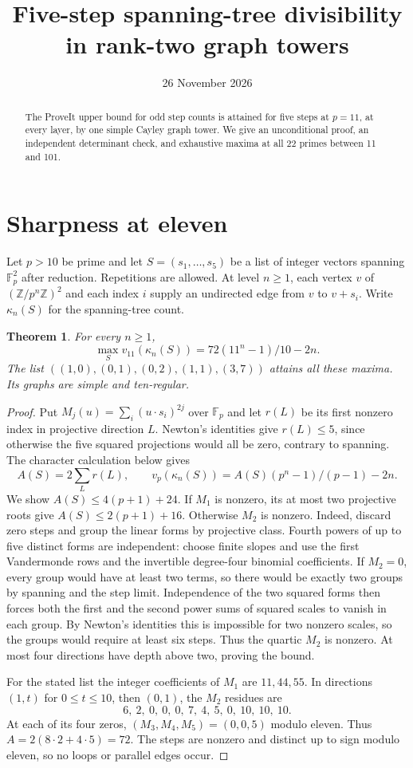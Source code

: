 \documentclass[11pt]{article}
\title{Five-step spanning-tree divisibility\\in rank-two graph towers}
\author{}
\date{26 November 2026}
\newtheorem{theorem}{Theorem}
\begin{document}
\maketitle
\vspace{-2em}
\begin{abstract}
The ProveIt upper bound for odd step counts is attained for five steps
at $p=11$, at every layer, by one simple Cayley graph tower.
We give an unconditional proof, an independent determinant check,
and exhaustive maxima at all 22 primes between 11 and 101.
\end{abstract}
\section{Sharpness at eleven}
Let $p>10$ be prime and let $S=(s_1,\ldots,s_5)$ be a list of integer
vectors spanning $\mathbb F_p^2$ after reduction. Repetitions are
allowed. At level $n\ge1$, each vertex $v$ of $(\mathbb Z/p^n\mathbb Z)^2$
and each index $i$ supply an undirected edge from $v$ to $v+s_i$.
Write $\kappa_n(S)$ for the spanning-tree count.
\begin{theorem}
For every $n\ge1$,
\[
\max_S v_{11}(\kappa_n(S))=72(11^n-1)/10-2n.
\]
The list $((1,0),(0,1),(0,2),(1,1),(3,7))$ attains all these maxima.
Its graphs are simple and ten-regular.
\end{theorem}
\begin{proof}
Put $M_j(u)=\sum_i(u\cdot s_i)^{2j}$ over $\mathbb F_p$ and let $r(L)$
be its first nonzero index in projective direction $L$. Newton's
identities give $r(L)\le5$, since otherwise the five squared
projections would all be zero, contrary to spanning. The character
calculation below gives
\[
 A(S)=2\sum_L r(L),\qquad v_p(\kappa_n(S))=A(S)(p^n-1)/(p-1)-2n.
\]
We show $A(S)\le4(p+1)+24$. If $M_1$ is nonzero, its at most two
projective roots give $A(S)\le2(p+1)+16$. Otherwise $M_2$ is nonzero.
Indeed, discard zero steps and group the linear forms by projective
class. Fourth powers of up to five distinct forms are independent:
choose finite slopes and use the first Vandermonde rows and the
invertible degree-four binomial coefficients. If $M_2=0$, every
group would have at least two terms, so there would be exactly two
groups by spanning and the step limit. Independence of the two
squared forms then forces both the first and the second power sums
of squared scales to vanish in each group. By Newton's identities
this is impossible for two nonzero scales, so the groups would
require at least six steps. Thus the quartic $M_2$ is nonzero.
At most four directions have depth above two, proving the bound.

For the stated list the integer coefficients of $M_1$ are $11,44,55$.
In directions $(1,t)$ for $0\le t\le10$, then $(0,1)$, the $M_2$
residues are
\[
 6,\ 2,\ 0,\ 0,\ 0,\ 7,\ 4,\ 5,\ 0,\ 10,\ 10,\ 10.
\]
At each of its four zeros, $(M_3,M_4,M_5)=(0,0,5)$ modulo eleven.
Thus $A=2(8\cdot2+4\cdot5)=72$. The steps are nonzero and distinct up
to sign modulo eleven, so no loops or parallel edges occur.
\end{proof}
\end{document}
